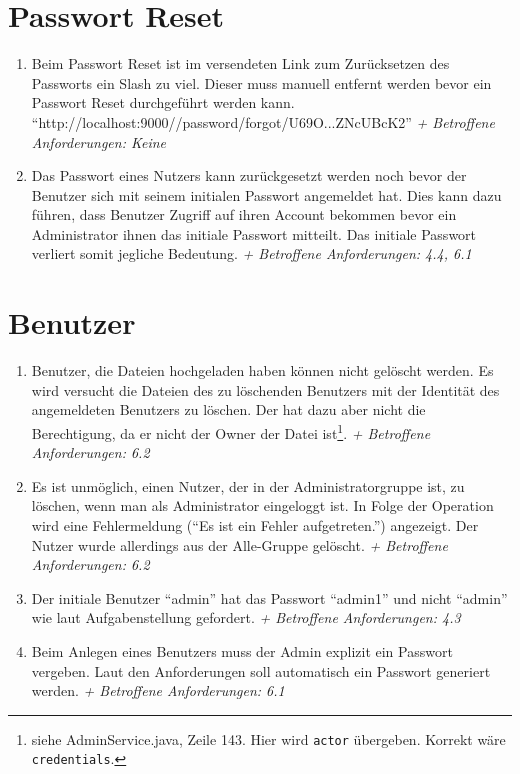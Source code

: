 \documentclass[12pt,DIV14,BCOR10mm,a4paper,parskip=half-,headsepline,headinclude,english,ngerman,bibliography=totocnumbered]{scrreprt}
\begin{document}
 \section{Passwort Reset}
\begin{enumerate}[resume]
\item Beim Passwort Reset ist im versendeten Link zum Zurücksetzen des Passworts ein Slash zu viel. Dieser muss manuell entfernt werden bevor ein Passwort Reset durchgeführt werden kann.\newline
\enquote{http://localhost:9000//password/forgot/U69O...ZNcUBcK2}\newline
\textit{+ Betroffene Anforderungen: Keine}

\item Das Passwort eines Nutzers kann zurückgesetzt werden noch bevor der Benutzer sich mit seinem initialen Passwort angemeldet hat. Dies kann dazu führen, dass Benutzer Zugriff auf ihren Account bekommen bevor ein Administrator ihnen das initiale Passwort mitteilt. Das initiale Passwort verliert somit jegliche Bedeutung.\newline
\textit{+ Betroffene Anforderungen: 4.4, 6.1}
  \end{enumerate}


\section{Benutzer}
\begin{enumerate}[resume]
\item Benutzer, die Dateien hochgeladen haben können nicht gelöscht werden. Es wird versucht die Dateien des zu löschenden Benutzers mit der Identität des angemeldeten Benutzers zu löschen. Der hat dazu aber nicht die Berechtigung, da er nicht der Owner der Datei ist\footnote{siehe AdminService.java, Zeile 143. Hier wird \texttt{actor} übergeben. Korrekt wäre \texttt{credentials}.}.\newline
\textit{+ Betroffene Anforderungen: 6.2}

\item Es ist unmöglich, einen Nutzer, der in der Administratorgruppe ist, zu löschen, wenn man als Administrator eingeloggt ist. In Folge der Operation wird eine Fehlermeldung (\enquote{Es ist ein Fehler aufgetreten.}) angezeigt. Der Nutzer wurde allerdings aus der Alle-Gruppe gelöscht.\newline
\textit{+ Betroffene Anforderungen: 6.2}


\item Der initiale Benutzer \enquote{admin} hat das Passwort \enquote{admin1} und nicht \enquote{admin} wie laut Aufgabenstellung gefordert.\newline
\textit{+ Betroffene Anforderungen: 4.3}


\item Beim Anlegen eines Benutzers muss der Admin explizit ein Passwort vergeben. Laut den Anforderungen soll automatisch ein Passwort generiert werden.\newline
\textit{+ Betroffene Anforderungen: 6.1}
 \end{enumerate}
\end{document}
